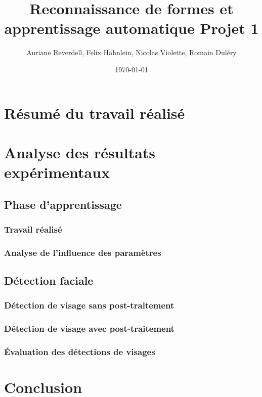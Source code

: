 \documentclass[a4paper,11pt]{article}
\title{Reconnaissance de formes et apprentissage automatique Projet 1}
\author{Auriane Reverdell, Felix Hähnlein, Nicolas Violette, Romain Duléry}
\date{\today}
\begin{document}
\maketitle
\vspace{1cm}

\section{Résumé du travail réalisé}

\section{Analyse des résultats expérimentaux}

    \subsection{Phase d'apprentissage}

	\subsubsection{Travail réalisé}

	\subsubsection{Analyse de l'influence des paramètres}

    \subsection{Détection faciale}

	\subsubsection{Détection de visage sans post-traitement}

	\subsubsection{Détection de visage avec post-traitement}

	\subsubsection{Évaluation des détections de visages}

\section{Conclusion}
\end{document}
